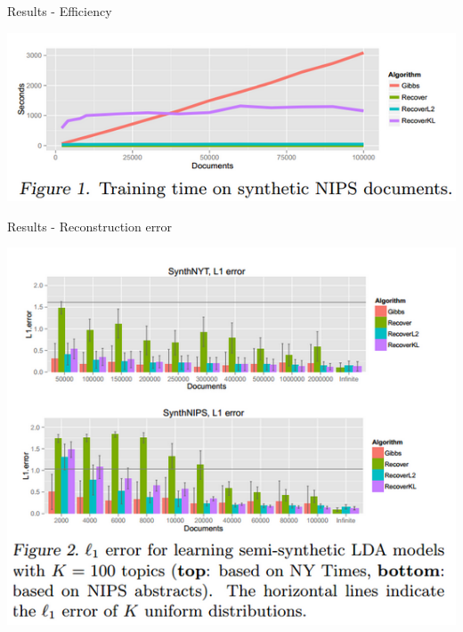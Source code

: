 \documentclass{lecture}
\begin{document}
\begin{plain}{Results - Efficiency}
\begin{center}
\includegraphics[scale=0.7]{figs/results_fig1}
\end{center}
\end{plain}

\begin{plain}{Results - Reconstruction error}
\begin{center}
\includegraphics[scale=0.58]{figs/results_fig2}
\end{center}
\end{plain}
\end{document}
